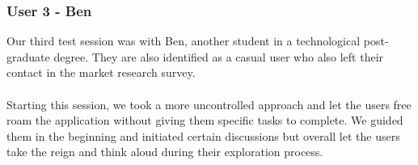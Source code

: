 \newpage
\subsubsection{User 3 - Ben}
Our third test session was with Ben, another student in a technological post-graduate degree. They are also identified as a casual user who also left their contact in the market research survey.\\\\
Starting this session, we took a more uncontrolled approach and let the users free roam the application without giving them specific tasks to complete. We guided them in the beginning and initiated certain discussions but overall let the users take the reign and think aloud during their exploration process.\\\\
